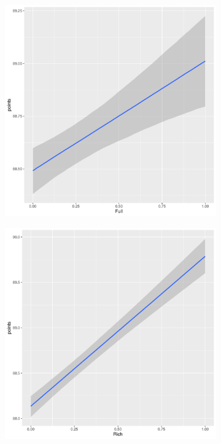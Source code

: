 \documentclass{article}
\begin{document}
\begin{figure}[htbp]
	\begin{subfigure}{0.22\textwidth}
		\includegraphics[width=\textwidth]{imgs/Rplots-19.pdf}
	\end{subfigure}\hfill
	\begin{subfigure}{0.22\textwidth}
		\includegraphics[width=\textwidth]{imgs/Rplots-20.pdf}

\end{subfigure}
\end{figure}
\end{document}
